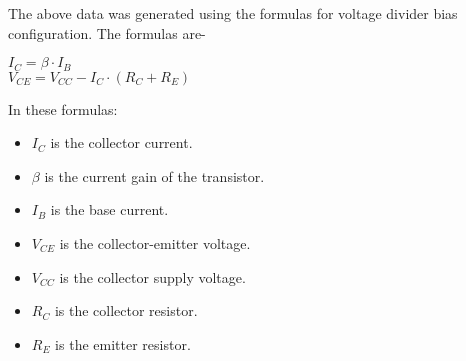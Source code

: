 \documentclass[a4paper, 12pt]{extarticle}
\begin{document}
The above data was generated using the formulas for voltage divider bias configuration. The formulas are-\\
\begin{center}
$I_C = \beta \cdot I_B$\\
$V_{CE} = V_{CC} - I_C \cdot (R_C + R_E)$\\
\end{center}
In these formulas:
\begin{itemize}
    \item $I_C$ is the collector current.
    \item $\beta$ is the current gain of the transistor.
    \item $I_B$ is the base current.
    \item $V_{CE}$ is the collector-emitter voltage.
    \item $V_{CC}$ is the collector supply voltage.
    \item $R_C$ is the collector resistor.
    \item $R_E$ is the emitter resistor.
\end{itemize}
\end{document}
